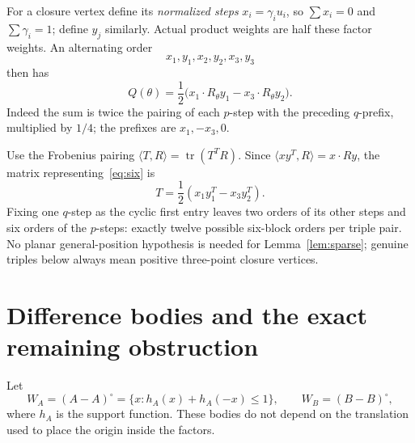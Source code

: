 \documentclass[11pt,a4paper]{article}
\theoremstyle{definition}\newtheorem{definition}[theorem]{Definition}
\theoremstyle{remark}\newtheorem{remark}[theorem]{Remark}
\newcommand{\tr}{\operatorname{tr}}
\newcommand{\ip}[2]{\langle #1,#2\rangle}
\begin{document}
For a closure vertex define its \emph{normalized steps} $x_i=\gamma_i u_i$, so $\sum x_i=0$ and $\sum\gamma_i=1$; define $y_j$ similarly. Actual product weights are half these factor weights. An alternating order
\[
 x_1,y_1,x_2,y_2,x_3,y_3
\]
then has
\begin{equation}\label{eq:six}
 Q(\theta)=\frac12\bigl(x_1\cdot R_\theta y_1-x_3\cdot R_\theta y_2\bigr).
\end{equation}
Indeed the sum is twice the pairing of each $p$-step with the preceding $q$-prefix, multiplied by $1/4$; the prefixes are $x_1,-x_3,0$.

Use the Frobenius pairing $\ip TR=\tr(T^TR)$. Since $\ip{xy^T}R=x\cdot Ry$, the matrix representing~\eqref{eq:six} is
\begin{equation}\label{eq:six-tensor}
 T=\frac12(x_1y_1^T-x_3y_2^T).
\end{equation}
Fixing one $q$-step as the cyclic first entry leaves two orders of its other steps and six orders of the $p$-steps: exactly twelve possible six-block orders per triple pair. No planar general-position hypothesis is needed for Lemma~\ref{lem:sparse}; genuine triples below always mean positive three-point closure vertices.

\section{Difference bodies and the exact remaining obstruction}\label{sec:width}
Let
\[
 W_A=(A-A)^\circ=\{x:h_A(x)+h_A(-x)\le1\},
 \qquad W_B=(B-B)^\circ,
\]
where $h_A$ is the support function. These bodies do not depend on the translation used to place the origin inside the factors.
\end{document}
